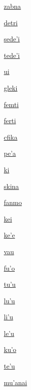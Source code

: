 {\hyperlink{val:zabna}{zabna}}{}{}{}

{\hyperlink{val:detri}{detri}}{}{}{}

{\hyperlink{val:sedehi}{sede'i}}{}{}{}

{\hyperlink{val:tedehi}{tede'i}}{}{}{}

{\hyperlink{val:ui}{ui}}{}{}{}

{\hyperlink{val:gleki}{gleki}}{}{}{}

{\hyperlink{val:femti}{femti}}{}{}{}

{\hyperlink{val:ferti}{ferti}}{}{}{}

{\hyperlink{val:cfika}{cfika}}{}{}{}

{\hyperlink{val:peha}{pe'a}}{}{}{}

{\hyperlink{val:ki}{ki}}{}{}{}

{\hyperlink{val:skina}{skina}}{}{}{}

{\hyperlink{val:fanmo}{fanmo}}{}{}{}

{\hyperlink{val:kei}{kei}}{}{}{}

{\hyperlink{val:kehe}{ke'e}}{}{}{}

{\hyperlink{val:vau}{vau}}{}{}{}

{\hyperlink{val:fuho}{fu'o}}{}{}{}

{\hyperlink{val:tuhu}{tu'u}}{}{}{}

{\hyperlink{val:luhu}{lu'u}}{}{}{}

{\hyperlink{val:lihu}{li'u}}{}{}{}

{\hyperlink{val:lehu}{le'u}}{}{}{}

{\hyperlink{val:kuho}{ku'o}}{}{}{}

{\hyperlink{val:tehu}{te'u}}{}{}{}

{\hyperlink{val:muhanai}{mu'anai}}{}{}{}

